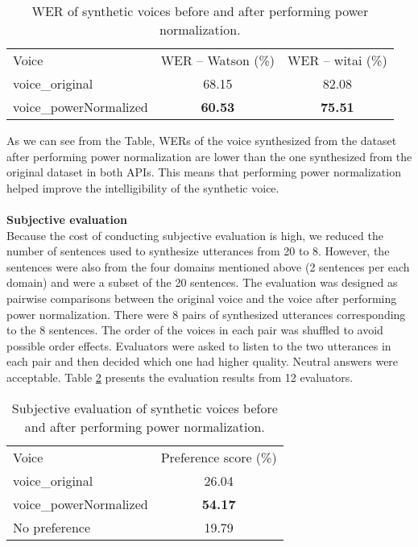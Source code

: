\documentclass[12pt]{article}
\begin{document}
\begin{table}[]
\begin{center}
\caption{WER of synthetic voices before and after performing power normalization.}
\label{tab_werPower}
\vspace{3mm}
\begin{tabular}{lcc}
\hline
Voice & WER – Watson (\%) & WER – witai (\%) \\
\cmidrule(l{0pt}r{2pt}){1-1}\cmidrule(l{0pt}r{2pt}){2-2}\cmidrule(l{0pt}r{2pt}){3-3}
voice\_original          & 68.15          & 82.08 \\
voice\_powerNormalized   & \textbf{60.53} & \textbf{75.51} \\
\hline
\end{tabular}
\end{center}
\end{table}

As we can see from the Table, WERs of the voice synthesized from the dataset after performing power normalization are lower than the one synthesized from the original dataset in both APIs. This means that performing power normalization helped improve the intelligibility of the synthetic voice.\\\\
\textbf{Subjective evaluation}
\vspace{0.28cm}\\
Because the cost of conducting subjective evaluation is high, we reduced the number of sentences used to synthesize utterances from 20 to 8. However, the sentences were also from the four domains mentioned above (2 sentences per each domain) and were a subset of the 20 sentences. The evaluation was designed as pairwise comparisons between the original voice and the voice after performing power normalization. There were 8 pairs of synthesized utterances corresponding to the 8 sentences. The order of the voices in each pair was shuffled to avoid possible order effects. Evaluators were asked to listen to the two utterances in each pair and then decided which one had higher quality. Neutral answers were acceptable. Table \ref{tab_subEvaPower} presents the evaluation results from 12 evaluators.

\begin{table}[]
\begin{center}
\caption{Subjective evaluation of synthetic voices before and after performing power normalization.}
\label{tab_subEvaPower}
\vspace{3mm}
\begin{tabular}{lc}
\hline
Voice & Preference score (\%) \\
\cmidrule(l{0pt}r{2pt}){1-1}\cmidrule(l{0pt}r{2pt}){2-2}
voice\_original         & 26.04 \\
voice\_powerNormalized  & \textbf{54.17} \\
No preference           & 19.79 \\
\hline
\end{tabular}
\end{center}
\end{table}
\end{document}
